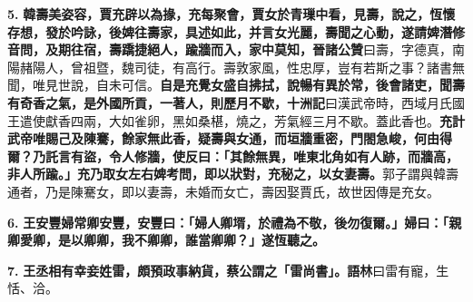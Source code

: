 \textbf{5.} \textbf{韓壽美姿容，賈充辟以為掾，充每聚會，賈女於青璅中看，見壽，說之，恆懷存想，發於吟詠，後婢往壽家，具述如此，并言女光麗，壽聞之心動，遂請婢潛修音問，及期往宿，壽蹻捷絕人，踰牆而入，家中莫知，}{\footnotesize \textbf{晉諸公贊}曰壽，字德真，南陽赭陽人，曾祖暨，魏司徒，有高行。壽敦家風，性忠厚，豈有若斯之事？諸書無聞，唯見世說，自未可信。}\textbf{自是充覺女盛自拂拭，說暢有異於常，後會諸吏，聞壽有奇香之氣，是外國所貢，一著人，則歷月不歇，}{\footnotesize \textbf{十洲記}曰漢武帝時，西域月氏國王遣使獻香四兩，大如雀卵，黑如桑椹，燒之，芳氣經三月不歇。蓋此香也。}\textbf{充計武帝唯賜己及陳騫，餘家無此香，疑壽與女通，而垣牆重密，門閤急峻，何由得爾？乃託言有盜，令人修牆，使反曰：「其餘無異，唯東北角如有人跡，而牆高，非人所踰。」充乃取女左右婢考問，即以狀對，充秘之，以女妻壽。}{\footnotesize 郭子謂與韓壽通者，乃是陳騫女，即以妻壽，未婚而女亡，壽因娶賈氏，故世因傳是充女。}

\textbf{6.} \textbf{王安豐婦常卿安豐，安豐曰：「婦人卿壻，於禮為不敬，後勿復爾。」婦曰：「親卿愛卿，是以卿卿，我不卿卿，誰當卿卿？」遂恆聽之。}

\textbf{7.} \textbf{王丞相有幸妾姓雷，頗預政事納貨，蔡公謂之「雷尚書」。}{\footnotesize \textbf{語林}曰雷有寵，生恬、洽。}